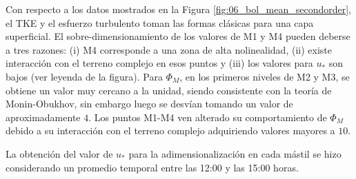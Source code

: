 Con respecto a los datos mostrados en la Figura \ref{fig:06_bol_mean_secondorder}, el TKE y el esfuerzo turbulento toman las formas clásicas para una capa superficial. El sobre-dimensionamiento de los valores de M1 y M4 pueden deberse a tres razones: (i) M4 corresponde a una zona de alta nolinealidad, (ii) existe interacción con el terreno complejo en esos puntos y (iii) los valores para $u_*$  son bajos (ver leyenda de la figura). Para $\Phi_M$, en los primeros niveles de M2 y M3, se obtiene un valor muy cercano a la unidad, siendo consistente con la teoría de Monin-Obukhov, sin embargo luego se desvían tomando un valor de aproximadamente $4$. Los puntos M1-M4 ven alterado su comportamiento de $\Phi_M$ debido a su interacción con el terreno complejo adquiriendo valores mayores a $10$.

La obtención del valor de $u_*$ para la adimensionalización en cada mástil se hizo considerando un promedio temporal entre las 12:00 y las 15:00 horas.

